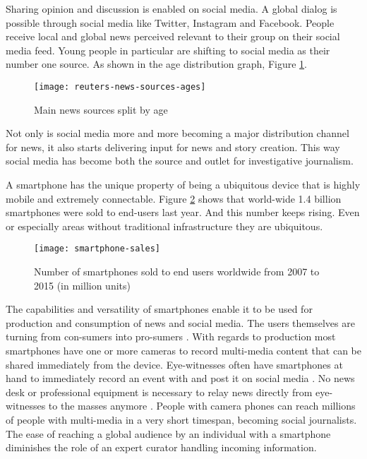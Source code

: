 Sharing opinion and discussion is enabled on social media.
A global dialog is possible through social media like Twitter, Instagram and Facebook.
People receive local and global news perceived relevant to their group on their social media feed.
Young people in particular are shifting to social media as their number one source. \cite{reuters_social_media}
As shown in the age distribution graph, Figure \ref{fig:reuters-news-sources-ages}.
\begin{figure}[H]
	\centering
	\texttt{[image: reuters-news-sources-ages]}
	\caption{Main news sources split by age \cite{reuters_social_media}}
	\label{fig:reuters-news-sources-ages}
\end{figure}
Not only is social media more and more becoming a major distribution channel for news, it also starts delivering input for news and story creation.
This way social media has become both the source and outlet for investigative journalism.

A smartphone has the unique property of being a ubiquitous device that is highly mobile and extremely connectable.
Figure \ref{fig:smartphone-sales} shows that world-wide 1.4 billion smartphones were sold to end-users last year.
And this number keeps rising.
Even or especially areas without traditional infrastructure they are ubiquitous.
\begin{figure}[H]
	\centering
	\texttt{[image: smartphone-sales]}
	\caption{Number of smartphones sold to end users worldwide from 2007 to 2015 (in million units) \cite{smartphone-sales}}
	\label{fig:smartphone-sales}
\end{figure}

The capabilities and versatility of smartphones enable it to be used for production and consumption of news and social media.
The users themselves are turning from con-sumers into pro-sumers \cite{??}.
With regards to production most smartphones have one or more cameras to record multi-media content that can be shared immediately from the device.
Eye-witnesses often have smartphones at hand to immediately record an event with and post it on social media \cite{paris-attacks}.
No news desk or professional equipment is necessary to relay news directly from eye-witnesses to the masses anymore \cite{belgium-attacks}.
People with camera phones can reach millions of people with multi-media in a very short timespan, becoming social journalists.
The ease of reaching a global audience by an individual with a smartphone diminishes the role of an expert curator handling incoming information.

